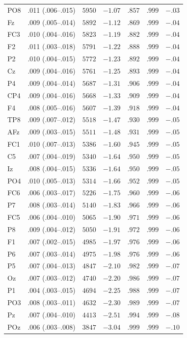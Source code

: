 {\begin{longtable}{llrrrrr}
PO8 & .011 (.006--.015) & $5950$ & $-1.07$ & $.857$ & $.999$ & $-.03$ \\
Fz & .009 (.005--.014) & $5892$ & $-1.12$ & $.869$ & $.999$ & $-.04$ \\
FC3 & .010 (.004--.016) & $5823$ & $-1.19$ & $.882$ & $.999$ & $-.04$ \\
F2 & .011 (.003--.018) & $5791$ & $-1.22$ & $.888$ & $.999$ & $-.04$ \\
P2 & .010 (.004--.015) & $5772$ & $-1.23$ & $.892$ & $.999$ & $-.04$ \\
Cz & .009 (.004--.016) & $5761$ & $-1.25$ & $.893$ & $.999$ & $-.04$ \\
P4 & .009 (.004--.014) & $5687$ & $-1.31$ & $.906$ & $.999$ & $-.04$ \\
CP4 & .009 (.004--.016) & $5668$ & $-1.33$ & $.909$ & $.999$ & $-.04$ \\
F4 & .008 (.005--.016) & $5607$ & $-1.39$ & $.918$ & $.999$ & $-.04$ \\
TP8 & .009 (.007--.012) & $5518$ & $-1.47$ & $.930$ & $.999$ & $-.05$ \\
AFz & .009 (.003--.015) & $5511$ & $-1.48$ & $.931$ & $.999$ & $-.05$ \\
FC1 & .010 (.007--.013) & $5386$ & $-1.60$ & $.945$ & $.999$ & $-.05$ \\
C5 & .007 (.004--.019) & $5340$ & $-1.64$ & $.950$ & $.999$ & $-.05$ \\
Iz & .008 (.004--.015) & $5336$ & $-1.64$ & $.950$ & $.999$ & $-.05$ \\
PO4 & .010 (.005--.013) & $5314$ & $-1.66$ & $.952$ & $.999$ & $-.05$ \\
FC6 & .006 (.003--.017) & $5226$ & $-1.75$ & $.960$ & $.999$ & $-.06$ \\
P7 & .008 (.003--.014) & $5140$ & $-1.83$ & $.966$ & $.999$ & $-.06$ \\
FC5 & .006 (.004--.010) & $5065$ & $-1.90$ & $.971$ & $.999$ & $-.06$ \\
P8 & .009 (.004--.012) & $5050$ & $-1.91$ & $.972$ & $.999$ & $-.06$ \\
F1 & .007 (.002--.015) & $4985$ & $-1.97$ & $.976$ & $.999$ & $-.06$ \\
P6 & .007 (.003--.014) & $4975$ & $-1.98$ & $.976$ & $.999$ & $-.06$ \\
P5 & .007 (.004--.013) & $4847$ & $-2.10$ & $.982$ & $.999$ & $-.07$ \\
Oz & .007 (.003--.012) & $4740$ & $-2.20$ & $.986$ & $.999$ & $-.07$ \\
P1 & .004 (.003--.015) & $4694$ & $-2.25$ & $.988$ & $.999$ & $-.07$ \\
PO3 & .008 (.003--.011) & $4632$ & $-2.30$ & $.989$ & $.999$ & $-.07$ \\
Pz & .007 (.004--.010) & $4413$ & $-2.51$ & $.994$ & $.999$ & $-.08$ \\
POz & .006 (.003--.008) & $3847$ & $-3.04$ & $.999$ & $.999$ & $-.10$ \\
\end{longtable}
}
